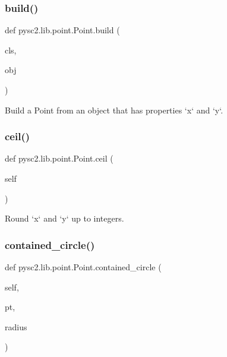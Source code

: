 \subsubsection{\texorpdfstring{build()}{build()}}
{\footnotesize\ttfamily def pysc2.\+lib.\+point.\+Point.\+build (\begin{DoxyParamCaption}\item[{}]{cls,  }\item[{}]{obj }\end{DoxyParamCaption})}

\begin{DoxyVerb}Build a Point from an object that has properties `x` and `y`.\end{DoxyVerb}
 \mbox{\label{classpysc2_1_1lib_1_1point_1_1_point_a6e9f32cef5a6f7137d459d37f5a8a9f7}} 
\subsubsection{\texorpdfstring{ceil()}{ceil()}}
{\footnotesize\ttfamily def pysc2.\+lib.\+point.\+Point.\+ceil (\begin{DoxyParamCaption}\item[{}]{self }\end{DoxyParamCaption})}

\begin{DoxyVerb}Round `x` and `y` up to integers.\end{DoxyVerb}
 \mbox{\label{classpysc2_1_1lib_1_1point_1_1_point_a2a9072cdc8c3270ced01cf5fa8d753b0}} 
\subsubsection{\texorpdfstring{contained\+\_\+circle()}{contained\_circle()}}
{\footnotesize\ttfamily def pysc2.\+lib.\+point.\+Point.\+contained\+\_\+circle (\begin{DoxyParamCaption}\item[{}]{self,  }\item[{}]{pt,  }\item[{}]{radius }\end{DoxyParamCaption})}

